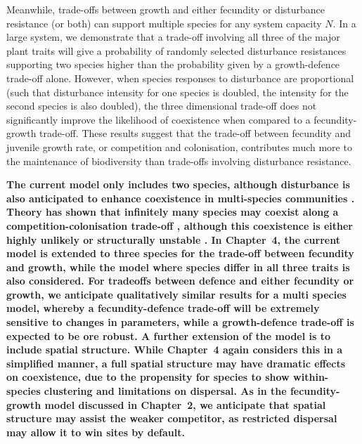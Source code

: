 Meanwhile, trade-offs between growth and either fecundity or disturbance resistance (or both) can support multiple species for any system capacity $N$. In a large system, we demonstrate that a trade-off involving all three of the major plant traits will give a probability of randomly selected disturbance resistances supporting two species higher than the probability given by a growth-defence trade-off alone. However, when species responses to disturbance are proportional (such that disturbance intensity for one species is doubled, the intensity for the second species is also doubled), the three dimensional trade-off does not significantly improve the likelihood of coexistence when compared to a fecundity-growth trade-off. These results suggest that the trade-off between fecundity and juvenile growth rate, or competition and colonisation, contributes much more to the maintenance of biodiversity than trade-offs involving disturbance resistance.  

\textbf{The current model only includes two species, although disturbance is also anticipated to enhance coexistence in multi-species communities \citep[e.g.][]{loehle2000strategy,roxburgh2004intermediate}. Theory has shown that infinitely many species may coexist along a competition-colonisation trade-off \citep{tilman1994competition,adler2000space}, although this coexistence is either highly unlikely or structurally unstable \citep{nattrass2012quantifying, gyllenberg2005impossibility}. In Chapter~4, the current model is extended to three species for the trade-off between fecundity and growth, while the model where species differ in all three traits is also considered. For tradeoffs between defence and either fecundity or growth, we anticipate qualitatively similar results for a multi species model, whereby a fecundity-defence trade-off will be extremely sensitive to changes in parameters, while a growth-defence trade-off is expected to be ore robust. A further extension of the model is to include spatial structure. While Chapter~4 again considers this in a simplified manner, a full spatial structure may have dramatic effects on coexistence, due to the propensity for species to show within-species clustering \citep{condit2000spatial,murrell2001uniting} and limitations on dispersal. As in the fecundity-growth model discussed in Chapter~2, we anticipate that spatial structure may assist the weaker competitor, as restricted dispersal may allow it to win sites by default.}

